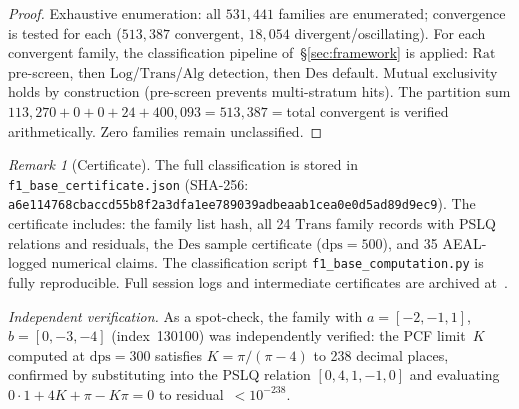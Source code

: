 \documentclass[12pt, reqno]{amsart}
\theoremstyle{definition}
\theoremstyle{remark}
\newtheorem{remark}[theorem]{Remark}
\newcommand{\Rat}{\mathrm{Rat}}
\newcommand{\Log}{\mathrm{Log}}
\newcommand{\Alg}{\mathrm{Alg}}
\newcommand{\Trans}{\mathrm{Trans}}
\newcommand{\Des}{\mathrm{Des}}
\begin{document}
\begin{proof}
Exhaustive enumeration: all $531{,}441$ families are enumerated;
convergence is tested for each ($513{,}387$ convergent, $18{,}054$ divergent/oscillating).
For each convergent family, the classification pipeline of~\S\ref{sec:framework} is applied:
$\Rat$ pre-screen, then $\Log$/$\Trans$/$\Alg$ detection, then $\Des$ default. Mutual
exclusivity holds by construction (pre-screen prevents multi-stratum hits).
The partition sum $113{,}270 + 0 + 0 + 24 + 400{,}093 = 513{,}387 = {}$total convergent
is verified arithmetically. Zero families remain unclassified.
\end{proof}

\begin{remark}[Certificate]\label{rem:cert}
The full classification is stored in
\texttt{f1\_base\_certificate.json} (SHA-256: \texttt{a6e114\allowbreak 768cba\allowbreak ccd55b\allowbreak 8f2a3d\allowbreak fa1ee7\allowbreak 89039a\allowbreak dbeaab\allowbreak 1cea0e\allowbreak 0d5ad8\allowbreak 9d9ec9}).
The certificate includes: the family list hash, all 24 $\Trans$ family records
with PSLQ relations and residuals, the $\Des$ sample certificate ($\mathrm{dps}=500$),
and 35 AEAL-logged numerical claims. The classification script
\texttt{f1\_base\_computation.py} is fully reproducible.
Full session logs and intermediate certificates are archived at~\cite{bridge}.

\emph{Independent verification.}
As a spot-check, the family
with $a = [-2, -1, 1]$, $b = [0, -3, -4]$ (index~130100)
was independently verified: the PCF limit~$K$ computed
at $\mathrm{dps}=300$ satisfies $K = \pi/(\pi-4)$ to 238 decimal places,
confirmed by substituting into the PSLQ relation
$[0, 4, 1, -1, 0]$ and evaluating $0 \cdot 1 + 4K + \pi - K\pi = 0$
to residual~$< 10^{-238}$.
\end{remark}
\end{document}
